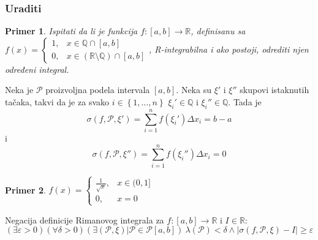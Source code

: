 \documentclass{article}
\newtheorem{prim}{Primer}[section]
\begin{document}
\subsubsection{Uraditi}

\begin{primbox}
    \label{primer_2.2}
    \begin{prim}
        Ispitati da li je funkcija $f: \left[a,b\right]\longrightarrow\mathbb{R}$, definisanu sa $f\left(x\right)=
            \begin{cases}
                1, & x \in \mathbb{Q} \cap \left[a,b\right]                                   \\
                0, & x \in \left(\mathbb{R} \setminus \mathbb{Q}\right) \cap \left[a,b\right]
            \end{cases}$, R-integrabilna i ako postoji, odrediti njen određeni integral.
    \end{prim}
    Neka je $\mathcal{P}$ proizvoljna podela intervala $\left[a,b\right]$. Neka su $\xi'$ i $\xi''$ skupovi
    istaknutih tačaka, takvi da je za svako $i\in\left\{1,\dotsc,n\right\}$ $\xi_i'\in\mathbb{Q}$ i
    $\xi_i''\in\mathbb{Q}$. Tada je
    \begin{equation}
        \label{primer_2.2:eq1}
        \sigma\left(f,\mathcal{P},\xi'\right)=\sum_{i=1}^{n}f\left(\xi_i'\right)\Delta x_i=b-a
    \end{equation}
    i
    \begin{equation}
        \label{primer_2.2:eq2}
        \sigma\left(f,\mathcal{P},\xi''\right)=\sum_{i=1}^{n}f\left(\xi_i''\right)\Delta x_i=0
    \end{equation}


\end{primbox}

\begin{primbox}
    \label{primer_2.3}
    \begin{prim}
        $f\left(x\right)=
            \begin{cases}
                \frac{1}{\sqrt{x}}, & x \in (0,1] \\
                0,                  & x =0
            \end{cases}$
    \end{prim}
    Negacija definicije Rimanovog integrala za $f:\left[a,b\right]\longrightarrow\mathbb{R}$ i $I\in\mathbb{R}$:
    $$\left(\exists\varepsilon>0\right)\left(\forall\delta>0\right)\left(\exists\left(\mathcal{P},\xi\right)\big|\mathcal{P}\in\mathcal{P}\left[a,b\right]\right)\ \lambda\left(\mathcal{P}\right)<\delta\land|\sigma\left(f,\mathcal{P},\xi\right)-I|\geq\varepsilon$$
\end{primbox}
\end{document}
